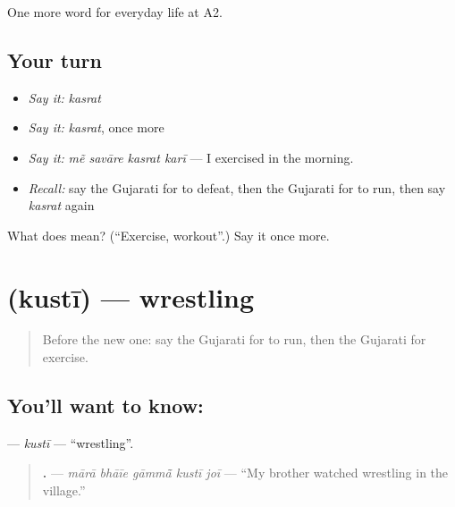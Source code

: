 \begin{grammarlens}[title={What you've built}]
One more word for everyday life at A2.
\end{grammarlens}

\subsection*{Your turn}
\begin{itemize}
\raggedright
  \item \emph{Say it:} \emph{kasrat}
  \item \emph{Say it:} \emph{kasrat}, once more
  \item \emph{Say it:} \emph{mẽ savāre kasrat karī} — I exercised in the morning.
  \item \emph{Recall:} say the Gujarati for to defeat, then the Gujarati for to run, then say \emph{kasrat} again
\end{itemize}

\begin{tcolorbox}[breakable,colback=teal!4,colframe=teal!35!black,title={Before you move on}]
What does  mean? (\textquotedblleft{}Exercise, workout\textquotedblright{}.) Say it once more.
\end{tcolorbox}
\section[\texorpdfstring{\gu{કુસ્તી} (kustī)}{કુસ્તી (kustī)}]{ (kustī) — wrestling}

\label{lesson:GU-C259-kusti}



\begin{quote}
Before the new one: say the Gujarati for to run, then the Gujarati for exercise.
\end{quote}

\subsection*{You'll want to know: }
\textbf{} — \emph{kustī} — \textquotedblleft{}wrestling\textquotedblright{}.

\begin{quote}
\textbf{    .} — \emph{mārā bhāīe gāmmā̃ kustī joī} — \textquotedblleft{}My brother watched wrestling in the village.\textquotedblright{}
\end{quote}

